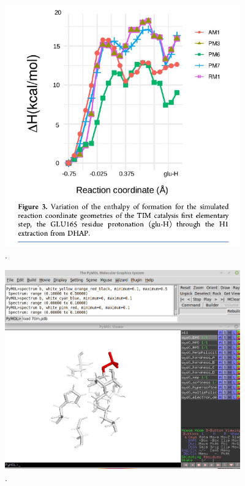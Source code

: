\documentclass[a4paper,11pt]{refart}
\begin{document}
\hspace*{-\leftmarginwidth}
\begin{minipage}{\fullwidth}
	\begin{figure}[H]
		\begin{center}
			\includegraphics[width=4in]{images/tut6_img6}
			\caption{.}
			\label{fig_tut6_5}
		\end{center}
	\end{figure}
\end{minipage}




\hspace*{-\leftmarginwidth}
\begin{minipage}{\fullwidth}
	\begin{figure}[H]
		\begin{center}
			\includegraphics[width=4in]{images/tut6_img8}
			\caption{.}
			\label{fig_tut6_7}
		\end{center}
	\end{figure}
\end{minipage}
\end{document}
